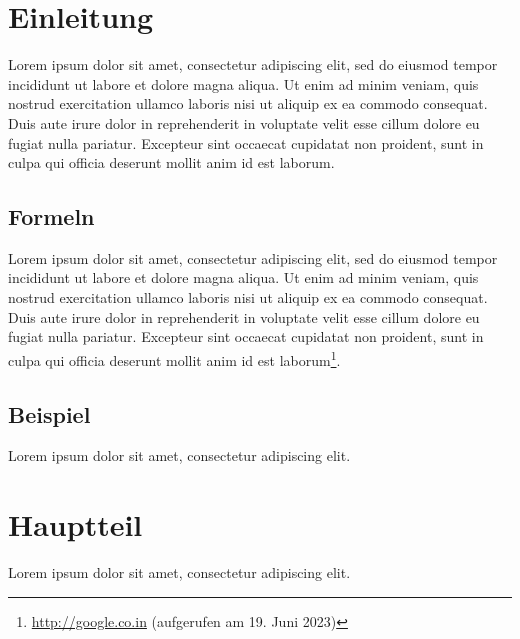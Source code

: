 \chapter{Einleitung}
Lorem ipsum dolor sit amet, consectetur adipiscing elit, sed do eiusmod tempor incididunt ut labore et dolore magna aliqua. Ut enim ad minim veniam, quis nostrud exercitation ullamco laboris nisi ut aliquip ex ea commodo consequat. Duis aute irure dolor in reprehenderit in voluptate velit esse cillum dolore eu fugiat nulla pariatur. Excepteur sint occaecat cupidatat non proident, sunt in culpa qui officia deserunt mollit anim id est laborum.
\section{Formeln}
Lorem ipsum dolor sit amet, consectetur adipiscing elit, sed do eiusmod tempor incididunt ut labore et dolore magna aliqua. Ut enim ad minim veniam, quis nostrud exercitation ullamco laboris nisi ut aliquip ex ea commodo consequat. Duis aute irure dolor in reprehenderit in voluptate velit esse cillum dolore eu fugiat nulla pariatur. Excepteur sint occaecat cupidatat non proident, sunt in culpa qui officia deserunt mollit anim id est laborum\footnote{\url{http://google.co.in} (aufgerufen am 19. Juni 2023)}.
\section{Beispiel}
Lorem ipsum dolor sit amet, consectetur adipiscing elit.
\chapter{Hauptteil}
Lorem ipsum dolor sit amet, consectetur adipiscing elit.\cite{Glohr2013}